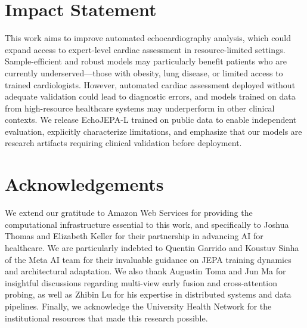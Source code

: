 \documentclass{article}
\theoremstyle{plain}
\theoremstyle{definition}
\theoremstyle{remark}
\begin{document}
\section*{Impact Statement}
This work aims to improve automated echocardiography analysis, which could expand access to expert-level cardiac assessment in resource-limited settings. Sample-efficient and robust models may particularly benefit patients who are currently underserved---those with obesity, lung disease, or limited access to trained cardiologists. However, automated cardiac assessment deployed without adequate validation could lead to diagnostic errors, and models trained on data from high-resource healthcare systems may underperform in other clinical contexts. We release EchoJEPA-L trained on public data to enable independent evaluation, explicitly characterize limitations, and emphasize that our models are research artifacts requiring clinical validation before deployment.

\section*{Acknowledgements}

We extend our gratitude to Amazon Web Services for providing the computational infrastructure essential to this work, and specifically to Joshua Thomas and Elizabeth Keller for their partnership in advancing AI for healthcare. We are particularly indebted to Quentin Garrido and Koustuv Sinha of the Meta AI team for their invaluable guidance on JEPA training dynamics and architectural adaptation. We also thank Augustin Toma and Jun Ma for insightful discussions regarding multi-view early fusion and cross-attention probing, as well as Zhibin Lu for his expertise in distributed systems and data pipelines. Finally, we acknowledge the University Health Network for the institutional resources that made this research possible.






\newpage
\appendix
\onecolumn
\end{document}
